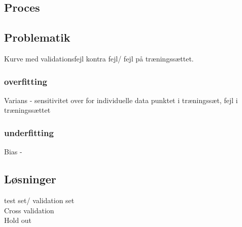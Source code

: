 \subsection{Proces}
\subsection{Problematik}

Kurve med validationsfejl kontra fejl/ fejl på træningssættet. 

\subsubsection{overfitting}
Varians - sensitivitet over for individuelle data punktet i træningssæt, fejl i træningssættet
\subsubsection{underfitting}
Bias - 

\subsection{Løsninger}
test set/ validation set
\\ Cross validation
\\ Hold out
